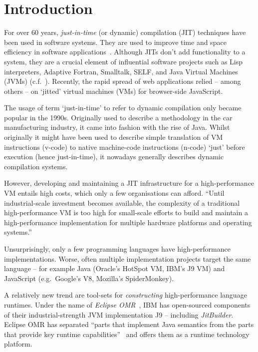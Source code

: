 
\section{Introduction}

For over 60 years, \emph{just-in-time} (or dynamic) compilation (JIT) techniques
have been used in software systems. They are used to improve time and space
efficiency in software applications~\cite{aycock2003brief}. Although JITs don't
add functionality to a system, they are a crucial element of influential
software projects such as Lisp interpreters, Adaptive Fortran, Smalltalk, SELF,
and Java Virtual Machines (JVMs) (c.f.~\cite{arnold2005survey}). Recently, the
rapid spread of web applications relied -- among others -- on `jitted' virtual
machines (VMs) for browser-side JavaScript.

The usage of term `just-in-time' to refer to dynamic compilation only became
popular in the 1990s. Originally used to describe a methodology in the car
manufacturing industry, it came into fashion with the rise of Java. Whilst
originally it might have been used to describe simple translation of VM
instructions (v-code) to native machine-code instructions (n-code) `just' before
execution (hence just-in-time), it nowadays generally describes dynamic
compilation systems.

However, developing and maintaining a JIT infrastructure for a high-performance
VM entails high costs, which only a few organisations can afford. ``Until
industrial-scale investment becomes available, the complexity of a traditional
high-performance VM is too high for small-scale efforts to build and maintain a
high-performance implementation for multiple hardware platforms and operating
systems.''~\cite{wurthinger2013one}

Unsurprisingly, only a few programming languages have high-performance
implementations. Worse, often multiple implementation projects
target the same language -- for example Java (Oracle's HotSpot VM, IBM's
J9 VM) and JavaScript (e.g.~Google's V8, Mozilla's SpiderMonkey).




A relatively new trend are tool-sets for \emph{constructing} high-performance
language runtimes. Under the name of \emph{Eclipse
OMR}~\cite{gaudet2016rebuilding}, IBM has open-sourced components of their
industrial-strength JVM implementation J9 -- including \emph{JitBuilder}.
Eclipse OMR has separated ``parts that implement Java semantics from the parts
that provide key runtime capabilities''~\cite{eclipseOMR} and offers them as a
runtime technology platform.

